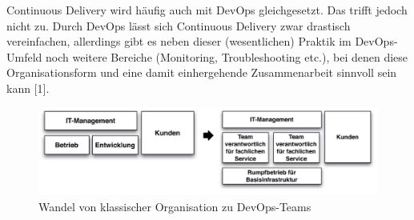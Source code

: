 Continuous Delivery wird häufig auch mit DevOps gleichgesetzt. Das trifft jedoch nicht zu. Durch DevOps lässt sich Continuous Delivery zwar drastisch vereinfachen, allerdings gibt es neben dieser (wesentlichen) Praktik im DevOps-Umfeld noch weitere Bereiche (Monitoring, Troubleshooting etc.), bei denen diese Organisationsform und eine damit einhergehende Zusammenarbeit sinnvoll sein kann [1].\\
\begin{figure}[h!]
	\centering
	\includegraphics[width=0.8\linewidth]{images/devops}
	\caption{Wandel von klassischer Organisation zu DevOps-Teams} %
	\label{fig:devops}
\end{figure}
